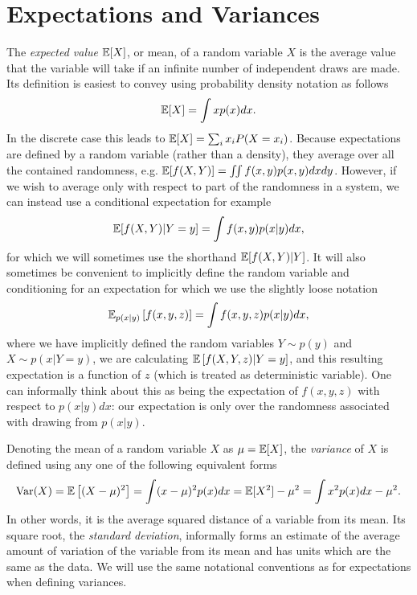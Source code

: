 \section{Expectations and Variances}
\label{sec:prob:expt}

The \emph{expected value} $\mathbb{E} [X]$, or mean, of a random variable $X$ is the average value that the variable
will take if an infinite number of independent draws are made.  Its definition is easiest to convey using 
probability density notation as follows
\begin{align}
\label{eq:prob:expt}
\mathbb{E} [X] = \int x p(x)dx.
\end{align}
In the discrete case this leads to $\mathbb{E} [X] = \sum_{i} x_i P(X=x_i)$.  Because expectations are defined by a random
variable (rather than a density), they
average over all the contained randomness, e.g. $\mathbb{E} [f(X,Y)]=\iint f(x,y) p(x,y)dxdy$.  However, if we
wish to average only with respect to part of the randomness in a system, we can instead use a conditional
expectation for example
\begin{align}
\label{eq:prob:cond-expt}
\mathbb{E} [f(X,Y) | Y=y] = \int f(x,y) p(x|y) dx,
\end{align}
for which we will sometimes use the shorthand $\mathbb{E} [f(X,Y) | Y]$.
It will also sometimes be convenient to implicitly define the random variable and conditioning for an 
expectation for which we use the slightly loose notation
\begin{align}
\label{eq:prob:expt-2}
\mathbb{E}_{p(x|y)} \left[f(x,y,z)\right] = \int f(x,y,z) p(x|y) dx,
\end{align}
where we have implicitly defined the random variables $Y \sim p(y)$ and $X \sim p(x | Y=y)$,
we are calculating $\mathbb{E} \left[f(X,Y,z) | Y=y\right]$,
and this resulting expectation is a function of $z$ (which is treated as deterministic variable).  
One can informally think about this
as being the expectation of $f(x,y,z)$ with respect to $p(x|y)dx$:
our expectation is only over the randomness associated with drawing from $p(x|y)$.  

Denoting the mean of a random variable $X$ as $\mu=\mathbb{E} [X]$, the \emph{variance} of $X$
is defined using any one of the following equivalent forms
\begin{align}
\mathrm{Var} (X) = \mathbb{E} \left[(X-\mu)^2\right] = \int (x-\mu)^2 p(x)dx = \mathbb{E} [X^2] - \mu^2 =
\int x^2 p(x) dx - \mu^2.
\end{align}
In other words, it is the average squared distance of a variable from its mean.
Its square root, the \emph{standard deviation}, informally forms an estimate of the average
amount of variation of the variable from its mean and has units which are the same
as the data.  We will use the same notational conventions as for expectations when defining
variances.

